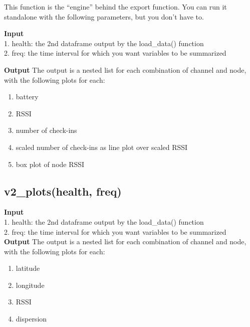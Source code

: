 \documentclass[
]{book}
\providecommand{\tightlist}{%
  \setlength{\itemsep}{0pt}\setlength{\parskip}{0pt}}
\begin{document}
This function is the ``engine'' behind the export function. You can run it standalone with the following parameters, but you don't have to.

\textbf{Input}\\
1. health: the 2nd dataframe output by the load\_data() function\\
2. freq: the time interval for which you want variables to be summarized

\textbf{Output}
The output is a nested list for each combination of channel and node, with the following plots for each:

\begin{enumerate}
\def\labelenumi{\arabic{enumi}.}
\tightlist
\item
  battery\\
\item
  RSSI\\
\item
  number of check-ins\\
\item
  scaled number of check-ins as line plot over scaled RSSI\\
\item
  box plot of node RSSI
\end{enumerate}

\hypertarget{v2_plotshealth-freq}{%
\subsection{v2\_plots(health, freq)}\label{v2_plotshealth-freq}}

\textbf{Input}\\
1. health: the 2nd dataframe output by the load\_data() function\\
2. freq: the time interval for which you want variables to be summarized\\
\textbf{Output} The output is a nested list for each combination of channel and node, with the following plots for each:

\begin{enumerate}
\def\labelenumi{\arabic{enumi}.}
\tightlist
\item
  latitude\\
\item
  longitude\\
\item
  RSSI\\
\item
  dispersion
\end{enumerate}
\end{document}
